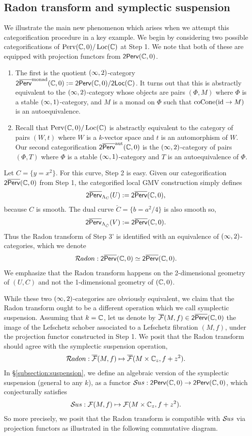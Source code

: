 \subsection{Radon transform and symplectic suspension}
We illustrate the main new phenomenon which arises when we attempt this categorification procedure in a key example. We begin by considering two possible categorifications of $\operatorname{Perv}(\mathbb{C},0)/\operatorname{Loc}(\mathbb{C})$ at Step 1. We note that both of these are equipped with projection functors from $\mathsf{2Perv}(\mathbb{C},0)$.
\begin{enumerate}
    \item The first is the quotient $(\infty,2)$-category $\mathsf{2}\overline{\mathsf{Perv}}^{\operatorname{monad}}(\mathbb{C},0) := \mathsf{2Perv}(\mathbb{C},0)/\mathsf{2Loc}(\mathbb{C})$. It turns out that this is abstractly equivalent to the $(\infty,2)$-category whose objects are pairs $(\Phi,M)$ where $\Phi$ is a stable $(\infty,1)$-category, and $M$ is a monad on $\Phi$ such that $\operatorname{coCone}(\operatorname{id}\to M)$ is an autoequivalence.
    \item Recall that $\operatorname{Perv}(\mathbb{C},0)/\operatorname{Loc}(\mathbb{C})$ is abstractly equivalent to the category of pairs $(W,t)$ where $W$ is a $k$-vector space and $t$ is an automorphism of $W$. Our second categorification $\mathsf{2}\overline{\mathsf{Perv}}^{\operatorname{aut}}(\mathbb{C},0)$ is the $(\infty,2)$-category of pairs $(\Phi,T)$ where $\Phi$ is a stable $(\infty,1)$-category and $T$ is an autoequivalence of $\Phi$.
\end{enumerate}

Let $C=\{y=x^2\}$. For this curve, Step 2 is easy. Given our categorification $\mathsf{2}\overline{\mathsf{Perv}}(\mathbb{C},0)$ from Step 1, the categorified local GMV construction simply defines
\[\mathsf{2}\overline{\mathsf{Perv}}_{\Lambda_C}(U) := \mathsf{2}\overline{\mathsf{Perv}}(\mathbb{C},0),\]
because $C$ is smooth. The dual curve $\check{C} = \{b=a^2/4\}$ is also smooth so,
\[\mathsf{2}\overline{\mathsf{Perv}}_{\Lambda_{\check{C}}}(V) := \mathsf{2}\overline{\mathsf{Perv}}(\mathbb{C},0).\]
Thus the Radon transform of Step 3' is identified with an equivalence of $(\infty,2)$-categories, which we denote
\[\mathcal{R}\kern -.5pt adon:\mathsf{2}\overline{\mathsf{Perv}}(\mathbb{C},0)\simeq \mathsf{2}\overline{\mathsf{Perv}}(\mathbb{C},0).\]
We emphasize that the Radon transform happens on the 2-dimensional geometry of $(U,C)$ and not the 1-dimensional geometry of $(\mathbb{C},0)$.

While these two $(\infty,2)$-categories are obviously equivalent, we claim that the Radon transform ought to be a different operation which we call symplectic suspension. Assuming that $k=\mathbb{C}$, let us denote by $\overline{\mathcal{F}}(M,f) \in \mathsf{2}\overline{\mathsf{Perv}}(\mathbb{C},0)$ the image of the Lefschetz schober associated to a Lefschetz fibration $(M,f)$, under the projection functor constructed in Step 1. We posit that the Radon transform should agree with the symplectic suspension operation,
\[\mathcal{R}\kern -.5pt adon:\overline{\mathcal{F}}(M,f)\mapsto \overline{\mathcal{F}}(M\times\mathbb{C}_z,f+z^2).\]
In \S\ref{subsection:suspension}, we define an algebraic version of the symplectic suspension (general to any $k$), as a functor $\mathcal{S}\kern -.5pt us: \mathsf{2Perv}(\mathbb{C},0)\to \mathsf{2Perv}(\mathbb{C},0)$, which conjecturally satisfies
\[\mathcal{S}\kern -.5pt us:\mathcal{F}(M,f)\mapsto \mathcal{F}(M\times\mathbb{C}_z,f+z^2).\]
So more precisely, we posit that the Radon transform is compatible with $\mathcal{S}\kern -.5pt us$ via projection functors as illustrated in the following commutative diagram.

